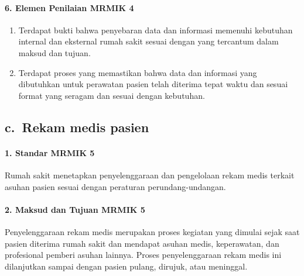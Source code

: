 \documentclass[
]{book}
\providecommand{\tightlist}{%
  \setlength{\itemsep}{0pt}\setlength{\parskip}{0pt}}
\begin{document}
\hypertarget{elemen-penilaian-mrmik-4}{%
\paragraph*{6. Elemen Penilaian MRMIK 4}\label{elemen-penilaian-mrmik-4}}

\begin{enumerate}
\def\labelenumi{\alph{enumi}.}
\tightlist
\item
  Terdapat bukti bahwa penyebaran data dan informasi memenuhi kebutuhan internal dan eksternal rumah sakit sesuai dengan yang tercantum dalam maksud dan tujuan.
\item
  Terdapat proses yang memastikan bahwa data dan informasi yang dibutuhkan untuk perawatan pasien telah diterima tepat waktu dan sesuai format yang seragam dan sesuai dengan kebutuhan.
\end{enumerate}

\hypertarget{c.-rekam-medis-pasien}{%
\subsection*{c.~Rekam medis pasien}\label{c.-rekam-medis-pasien}}

\hypertarget{standar-mrmik-5}{%
\paragraph*{1. Standar MRMIK 5}\label{standar-mrmik-5}}

Rumah sakit menetapkan penyelenggaraan dan pengelolaan rekam medis terkait asuhan pasien sesuai dengan peraturan perundang-undangan.

\hypertarget{maksud-dan-tujuan-mrmik-5}{%
\paragraph*{2. Maksud dan Tujuan MRMIK 5}\label{maksud-dan-tujuan-mrmik-5}}

Penyelenggaraan rekam medis merupakan proses kegiatan yang dimulai sejak saat pasien diterima rumah sakit dan mendapat asuhan medis, keperawatan, dan profesional pemberi asuhan lainnya. Proses penyelenggaraan rekam medis ini dilanjutkan sampai dengan pasien pulang, dirujuk, atau meninggal.
\end{document}
